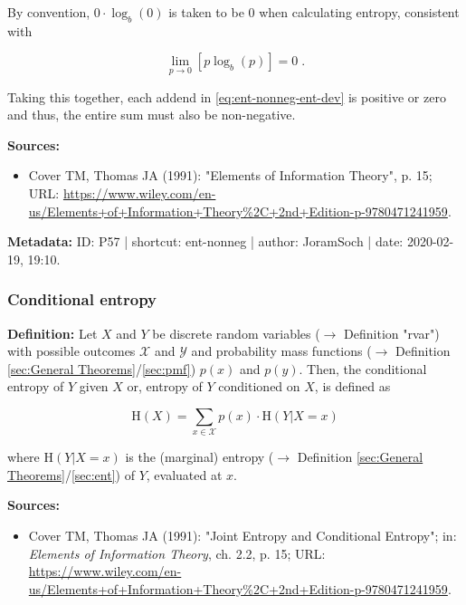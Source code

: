 \documentclass[a4paper,12pt]{book}
\begin{document}
By convention, $0 \cdot \log_b(0)$ is taken to be $0$ when calculating entropy, consistent with

\begin{equation} \label{eq:ent-nonneg-lim-0log0}
\lim_{p \to 0} \left[ p \log_b(p) \right] = 0 \; .
\end{equation}

Taking this together, each addend in \eqref{eq:ent-nonneg-ent-dev} is positive or zero and thus, the entire sum must also be non-negative.

\vspace{1em}
\textbf{Sources:}
\begin{itemize}
\item Cover TM, Thomas JA (1991): "Elements of Information Theory", p. 15; URL: \url{https://www.wiley.com/en-us/Elements+of+Information+Theory%2C+2nd+Edition-p-9780471241959}.
\end{itemize}


\vspace{1em}
\textbf{Metadata:} ID: P57 | shortcut: ent-nonneg | author: JoramSoch | date: 2020-02-19, 19:10.


\subsubsection[\textit{Conditional entropy}]{Conditional entropy} \label{sec:ent-cond}

\vspace{1em}
\textbf{Definition:} Let $X$ and $Y$ be discrete random variables ($\rightarrow$ Definition "rvar") with possible outcomes $\mathcal{X}$ and $\mathcal{Y}$ and probability mass functions ($\rightarrow$ Definition \ref{sec:General Theorems}/\ref{sec:pmf}) $p(x)$ and $p(y)$. Then, the conditional entropy of $Y$ given $X$ or, entropy of $Y$ conditioned on $X$, is defined as

\begin{equation} \label{eq:ent-cond-ent-cond}
\mathrm{H}(X) = \sum_{x \in \mathcal{X}} p(x) \cdot \mathrm{H}(Y|X=x)
\end{equation}

where $\mathrm{H}(Y \vert X=x)$ is the (marginal) entropy ($\rightarrow$ Definition \ref{sec:General Theorems}/\ref{sec:ent}) of $Y$, evaluated at $x$.

\vspace{1em}
\textbf{Sources:}
\begin{itemize}
\item Cover TM, Thomas JA (1991): "Joint Entropy and Conditional Entropy"; in: \textit{Elements of Information Theory}, ch. 2.2, p. 15; URL: \url{https://www.wiley.com/en-us/Elements+of+Information+Theory%2C+2nd+Edition-p-9780471241959}.
\end{itemize}
\end{document}
